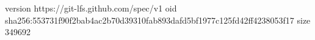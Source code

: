 version https://git-lfs.github.com/spec/v1
oid sha256:553731f90f2bab4ac2b70d39310fab893dafd5bf1977c125fd42ff4238053f17
size 349692
